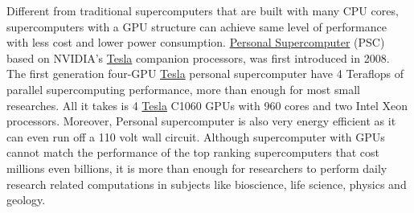 \documentclass[letterpaper,10pt,openany,oneside]{sphinxmanual}
\begin{document}
Different from traditional supercomputers that are built with many CPU cores, supercomputers with a GPU structure can achieve same level of performance with less cost and lower power consumption. \href{http://en.wikipedia.org/wiki/Nvidia\_Tesla\_\_Personal\_Supercomputer}{Personal Supercomputer} (PSC) based on NVIDIA's \href{http://www.nvidia.com/object/tesla-supercomputing-solutions.html}{Tesla} companion processors, was first introduced in 2008. The first generation four-GPU \href{http://www.nvidia.com/object/tesla-supercomputing-solutions.html}{Tesla} personal supercomputer have 4 Teraflops of parallel supercomputing performance, more than enough for most small researches. All it takes is 4 \href{http://www.nvidia.com/object/tesla-supercomputing-solutions.html}{Tesla} C1060 GPUs with 960 cores and two Intel Xeon processors. Moreover, Personal supercomputer is also very energy efficient as it can even run off a 110 volt wall circuit. Although supercomputer with GPUs cannot match the performance of the top ranking supercomputers that cost millions even billions, it is more than enough for researchers to perform daily research related computations in subjects like bioscience, life science, physics and geology.
\end{document}
